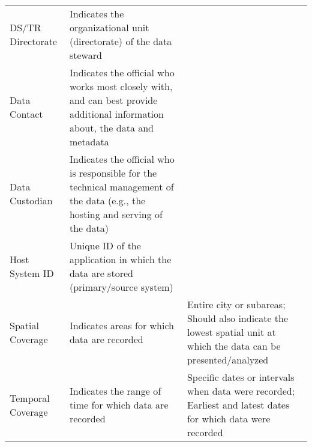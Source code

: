 \begin{table}
\begin{tabulary}{1.0\textwidth}{lLL}
DS/TR Directorate & Indicates the organizational unit (directorate) of the data steward & \\
Data Contact & Indicates the official who works most closely with, and can best provide additional information about, the data and metadata & \\
Data Custodian & Indicates the official who is responsible for the technical management of the data (e.g., the hosting and serving of the data) & \\
Host System ID & Unique ID of the application in which the data are stored (primary/source system) & \\
\addlinespace
Spatial Coverage & Indicates areas for which data are recorded & Entire city or subareas; Should also indicate the lowest spatial unit at which the data can be presented/analyzed\\
Temporal Coverage & Indicates the range of time for which data are recorded & Specific dates or intervals when data were recorded; Earliest and latest dates for which data were recorded\\
\bottomrule
\end{tabulary}
\end{table}